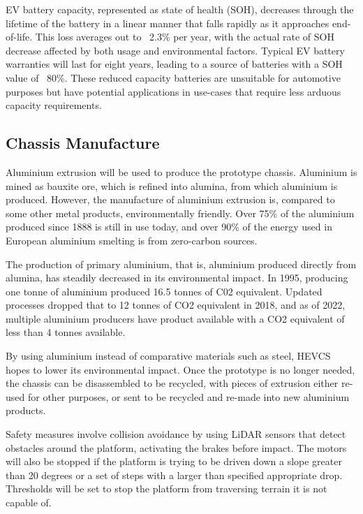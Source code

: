 \documentclass [12pt]{article}
\begin{document}
EV battery capacity, represented as state of health (SOH), decreases through the lifetime of the battery in a linear manner that falls rapidly as it approaches end-of-life. This loss averages out to ~2.3\% per year, with the actual rate of SOH decrease affected by both usage and environmental factors\cite{EV_Battery_Health}. Typical EV battery warranties will last for eight years, leading to a source of batteries with a SOH value of ~80\%\cite{EV_Battery_Longevity}. These reduced capacity batteries are unsuitable for automotive purposes but have potential applications in use-cases that require less arduous capacity requirements.

\subsection{Chassis Manufacture}
Aluminium extrusion will be used to produce the prototype chassis. Aluminium is mined as bauxite ore, which is refined into alumina, from which aluminium is produced. However, the manufacture of aluminium extrusion is, compared to some other metal products, environmentally friendly. Over 75\% of the aluminium produced since 1888 is still in use today, and over 90\% of the energy used in European aluminium smelting is from zero-carbon sources.

The production of primary aluminium, that is, aluminium produced directly from alumina, has steadily decreased in its environmental impact. In 1995, producing one tonne of aluminium produced 16.5 tonnes of C02 equivalent. Updated processes dropped that to 12 tonnes of CO2 equivalent in 2018, and as of 2022, multiple aluminium producers have product available with a CO2 equivalent of less than 4 tonnes available\cite{Al_Manufac}.

By using aluminium instead of comparative materials such as steel, HEVCS hopes to lower its environmental impact. Once the prototype is no longer needed, the chassis can be disassembled to be recycled, with pieces of extrusion either re-used for other purposes, or sent to be recycled and re-made into new aluminium products.



Safety measures involve collision avoidance by using LiDAR sensors that detect obstacles around the platform, activating the brakes before impact.
The motors will also be stopped if the platform is trying to be driven down a slope greater than 20 degrees or a set of steps with a larger  than specified appropriate drop.
Thresholds will be set to stop the platform from traversing terrain it is not capable of.
\end{document}
